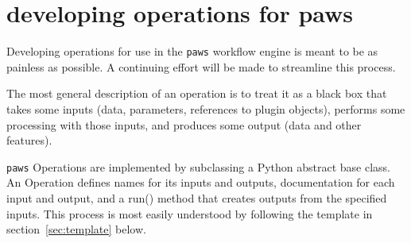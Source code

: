 
\section{developing operations for paws}
\label{sec:op_dev}

Developing operations for use in the \verb|paws| workflow engine 
is meant to be as painless as possible.
A continuing effort will be made to streamline this process.

The most general description of an operation 
is to treat it as a black box that takes some inputs 
(data, parameters, references to plugin objects),
performs some processing with those inputs,
and produces some output (data and other features).

\verb|paws| Operations are implemented 
by subclassing a Python abstract base class.
An Operation defines names for its inputs and outputs,
documentation for each input and output,
and a run() method that creates outputs from the specified inputs.
This process is most easily understood 
by following the template in section~\ref{sec:template} below.

